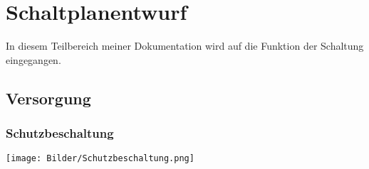 \documentclass[a4paper,11pt]{scrartcl}
\begin{document}

\section{Schaltplanentwurf}

\begin{center}
In diesem Teilbereich meiner Dokumentation wird auf die Funktion der Schaltung eingegangen. 
\end{center}

\subsection{Versorgung}

\subsubsection{Schutzbeschaltung}

\begin{center}
\texttt{[image: Bilder/Schutzbeschaltung.png]}
\end{center}
\end{document}
